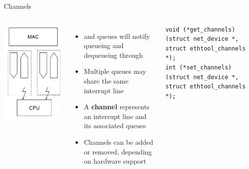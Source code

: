 \begin{frame}[fragile]{Channels}
	\begin{columns}
		\includegraphics[width=\textwidth]{slides/networking-driver-netdev/channels.pdf}
	\begin{itemize}
		\item {} and  queues will notify queueing and dequeueing through 
		\item Multiple queues may share the same interrupt line
		\item A \textbf{channel} represents an interrupt line and its associated queues
		\item Channels can be added or removed, depending on hardware support
	\end{itemize}
		\begin{verbatim}
void (*get_channels)(struct net_device *, struct ethtool_channels *);
int (*set_channels)(struct net_device *, struct ethtool_channels *);
		\end{verbatim}
	\end{columns}
\end{frame}

